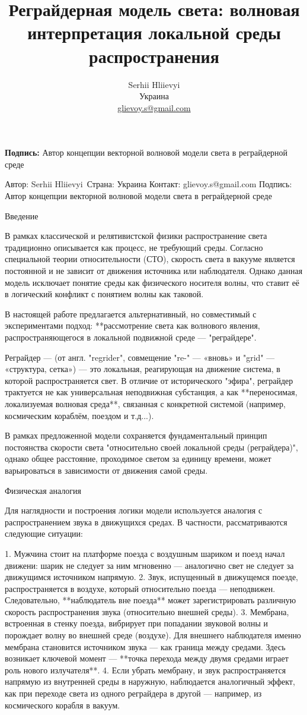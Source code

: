 \documentclass[12pt]{article}
\title{Реграйдерная модель света: волновая интерпретация локальной среды распространения}
\author{Serhii Hliievyi \\ Украина \\ \href{mailto:glievoy.s@gmail.com}{glievoy.s@gmail.com}}
\date{}
\begin{document}
\maketitle
\begin{center}\textbf{Подпись:} Автор концепции векторной волновой модели света в реграйдерной среде\end{center}

Автор: Serhii Hliievyi\
Страна: Украина
Контакт: glievoy.s@gmail.com
Подпись: Автор концепции векторной волновой модели света в реграйдерной среде


Введение

В рамках классической и релятивистской физики распространение света традиционно описывается как процесс, не требующий среды. Согласно специальной теории относительности (СТО), скорость света в вакууме является постоянной и не зависит от движения источника или наблюдателя. Однако данная модель исключает понятие среды как физического носителя волны, что ставит её в логический конфликт с понятием волны как таковой.

В настоящей работе предлагается альтернативный, но совместимый с экспериментами подход: **рассмотрение света как волнового явления, распространяющегося в локальной подвижной среде — "реграйдере".

Реграйдер — (от англ. "regrider", совмещение "re-" — «вновь» и "grid" — «структура, сетка») — это локальная, реагирующая на движение система, в которой распространяется свет. В отличие от исторического "эфира", реграйдер трактуется не как универсальная неподвижная субстанция, а как **переносимая, локализуемая волновая среда**, связанная с конкретной системой (например, космическим кораблём, поездом и т.д...).

В рамках предложенной модели сохраняется фундаментальный принцип постоянства скорости света "относительно своей локальной среды (реграйдера)", однако общее расстояние, проходимое светом за единицу времени, может варьироваться в зависимости от движения самой среды.


Физическая аналогия

Для наглядности и построения логики модели используется аналогия с распространением звука в движущихся средах. В частности, рассматриваются следующие ситуации:

1. Мужчина стоит на платформе поезда с воздушным шариком и поезд начал движени: шарик не следует за ним мгновенно — аналогично свет не следует за движущимся источником напрямую.
2. Звук, испущенный в движущемся поезде, распространяется в воздухе, который относительно поезда — неподвижен. Следовательно, **наблюдатель вне поезда** может зарегистрировать различную скорость распространения звука (относительно внешней среды).
3. Мембрана, встроенная в стенку поезда, вибрирует при попадании звуковой волны и порождает волну во внешней среде (воздухе). Для внешнего наблюдателя именно мембрана становится источником звука — как граница между средами. Здесь возникает ключевой момент — **точка перехода между двумя средами играет роль нового излучателя**.
4. Если убрать мембрану, и звук распространяется напрямую из внутренней среды в наружную, наблюдается аналогичный эффект, как при переходе света из одного реграйдера в другой — например, из космического корабля в вакуум.
\end{document}
